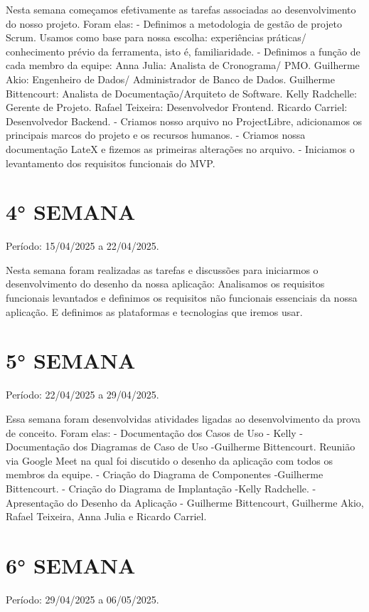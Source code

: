 \documentclass[
	12pt,				%
	openany,			%
	twoside,			%
	a4paper,			%
	english,			%
	french,				%
	spanish,			%
	brazil				%
	]{abntex2}
\begin{document}
\begin{apendicesenv}
Nesta semana começamos efetivamente as tarefas associadas ao desenvolvimento do nosso projeto. Foram elas:
- Definimos a metodologia de gestão de projeto Scrum. Usamos como base para  nossa escolha: experiências práticas/ conhecimento prévio da ferramenta, isto é, familiaridade. 
- Definimos a função de cada membro da equipe:
Anna Julia: Analista de Cronograma/ PMO.
Guilherme Akio: Engenheiro de Dados/ Administrador de Banco de Dados.
Guilherme Bittencourt: Analista de Documentação/Arquiteto de Software.
Kelly Radchelle: Gerente de Projeto.
Rafael Teixeira: Desenvolvedor Frontend.
Ricardo Carriel: Desenvolvedor Backend.
- Criamos nosso arquivo no ProjectLibre, adicionamos os principais marcos do projeto e os recursos humanos.
- Criamos nossa documentação LateX e fizemos as primeiras alterações no arquivo.
- Iniciamos o levantamento dos requisitos funcionais do MVP.


\section{4° SEMANA}
Período: 15/04/2025 a 22/04/2025.

Nesta semana foram realizadas as tarefas e discussões para iniciarmos o desenvolvimento do desenho da nossa aplicação:
Analisamos os requisitos funcionais levantados e definimos os requisitos não funcionais essenciais da nossa aplicação.
E definimos as plataformas e tecnologias que iremos usar.


\section{5° SEMANA}
Período: 22/04/2025 a 29/04/2025.

Essa semana foram desenvolvidas atividades ligadas ao desenvolvimento da prova de conceito. Foram elas:
- Documentação dos Casos de Uso - Kelly
- Documentação dos Diagramas de Caso de Uso -Guilherme Bittencourt.
Reunião via Google Meet na qual foi discutido o desenho da aplicação com todos os membros da equipe.
- Criação do Diagrama de Componentes -Guilherme Bittencourt.
- Criação do Diagrama de Implantação -Kelly Radchelle.
- Apresentação do Desenho da Aplicação - Guilherme Bittencourt, Guilherme Akio, Rafael Teixeira, Anna Julia e Ricardo Carriel.

\section{6° SEMANA}
Período: 29/04/2025 a 06/05/2025.


\end{apendicesenv}
\end{document}
